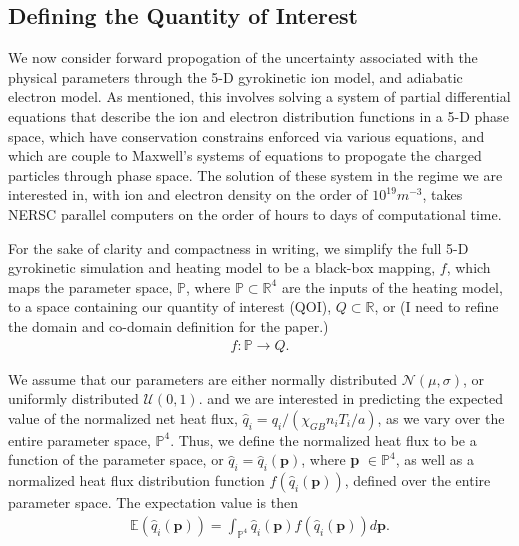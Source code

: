 \documentclass{article}
\begin{document}
\vspace{0.01cm}

\noindent
\subsection{Defining the Quantity of Interest}
We now consider forward propogation of the uncertainty associated with the physical parameters through the 5-D gyrokinetic ion model, and adiabatic electron model. As mentioned, this involves solving a system of partial differential equations that describe the ion and electron distribution functions in a 5-D phase space, which have conservation constrains enforced via various equations, and which are couple to Maxwell's systems of equations to propogate the charged particles through phase space. The solution of these system in the regime we are interested in, with ion and electron density on the order of $10^{19}m^{-3}$, takes NERSC parallel computers on the order of hours to days of computational time.\\


\vspace{0.01cm}
\noindent

For the sake of clarity and compactness in writing, we simplify the full 5-D gyrokinetic simulation and heating model to be a black-box mapping, $f$, which maps the parameter space, $\mathbb{P}$, where $\mathbb{P} \subset \mathbb{R}^4$ are the inputs of the heating model, to a space containing our quantity of interest  (QOI), $Q\subset \mathbb{R}$, or
(I need to refine the domain and co-domain definition for the paper.)
\begin{align*}
f:\mathbb{P} \to Q.
\end{align*}


We assume that our parameters are either normally distributed $\mathcal{N}(\mu, \sigma)$, or uniformly distributed $\mathcal{U}(0,1)$. and we are interested in predicting the expected value of the normalized net heat flux, $\hat{q}_i = q_i/(\chi_{GB}n_iT_i/a)$, as we vary over the entire parameter space, $\mathbb{P}^4$. Thus, we define the normalized heat flux to be a function of the parameter space, or $\hat{q}_i = \hat{q}_i(\textbf{p})$, where \textbf{p} $\in \mathbb{P}^4$, as well as a normalized heat flux distribution function $f(\hat{q}_i(\textbf{p}))$, defined over the entire parameter space. The expectation value is then
\begin{align*}
\mathbb{E}(\hat{q}_i(\textbf{p})) = \int_{\mathbb{P}^4}\hat{q}_i(\textbf{p}) f(\hat{q}_i(\textbf{p}))d\textbf{p}.
\end{align*}
\end{document}
